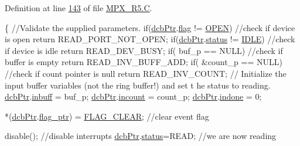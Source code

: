 Definition at line \hyperlink{_m_p_x___r5_8_c_source_l00143}{143} of file \hyperlink{_m_p_x___r5_8_c_source}{MPX\_\-R5.C}.




\begin{DoxyCode}
                                               \{
                \textcolor{comment}{//Validate the supplied parameters. }
                \textcolor{keywordflow}{if}(\hyperlink{_m_p_x___r5_8h_acf6724d515070007ff4ac39c32640311}{dcbPtr}.\hyperlink{structdevice_ac2d4a1d39c1a5a858d88f2482d6900c8}{flag} != \hyperlink{_m_p_x___r5_8h_a1354b70ac6803a06beebe84f61b5f95b}{OPEN}) \textcolor{comment}{//check if device is open}
                        \textcolor{keywordflow}{return} READ\_PORT\_NOT\_OPEN;
                \textcolor{keywordflow}{if}(\hyperlink{_m_p_x___r5_8h_acf6724d515070007ff4ac39c32640311}{dcbPtr}.\hyperlink{structdevice_aaaefcdae0117d89bef5340a1e3f432e1}{status} != \hyperlink{_m_p_x___r5_8h_a9c21a7caee326d7803b94ae1952b27ca}{IDLE}) \textcolor{comment}{//check if device is idle}
                        \textcolor{keywordflow}{return} READ\_DEV\_BUSY;
                \textcolor{keywordflow}{if}( buf\_p == NULL) \textcolor{comment}{//check if buffer is empty }
                        \textcolor{keywordflow}{return} READ\_INV\_BUFF\_ADD; 
                \textcolor{keywordflow}{if}( &count\_p == NULL) \textcolor{comment}{//check if count pointer is null }
                        \textcolor{keywordflow}{return} READ\_INV\_COUNT;  
        \textcolor{comment}{// Initialize the input buffer variables (not the ring buffer!) and set t
      he status to reading. }
                \hyperlink{_m_p_x___r5_8h_acf6724d515070007ff4ac39c32640311}{dcbPtr}.\hyperlink{structdevice_a031f8856932341c5b5bf979b4da0d5df}{inbuff} = buf\_p; 
                \hyperlink{_m_p_x___r5_8h_acf6724d515070007ff4ac39c32640311}{dcbPtr}.\hyperlink{structdevice_ab46085fdbca4da85dfbbbf7baafc4612}{incount} = count\_p; 
                \hyperlink{_m_p_x___r5_8h_acf6724d515070007ff4ac39c32640311}{dcbPtr}.\hyperlink{structdevice_aff338e9d555a8f740e997650a862b523}{indone} = 0; 

                *(\hyperlink{_m_p_x___r5_8h_acf6724d515070007ff4ac39c32640311}{dcbPtr}.\hyperlink{structdevice_aa14e67b7bd4e2bc5751268f0be91983f}{flag_ptr}) = \hyperlink{_m_p_x___r5_8h_a269d0ebbb16b030f6fe231046e7c084a}{FLAG_CLEAR}; \textcolor{comment}{//clear event flag}
                
                disable(); \textcolor{comment}{//disable interrupts }
                \hyperlink{_m_p_x___r5_8h_acf6724d515070007ff4ac39c32640311}{dcbPtr}.\hyperlink{structdevice_aaaefcdae0117d89bef5340a1e3f432e1}{status}=READ; \textcolor{comment}{//we are now reading}


\end{DoxyCode}
